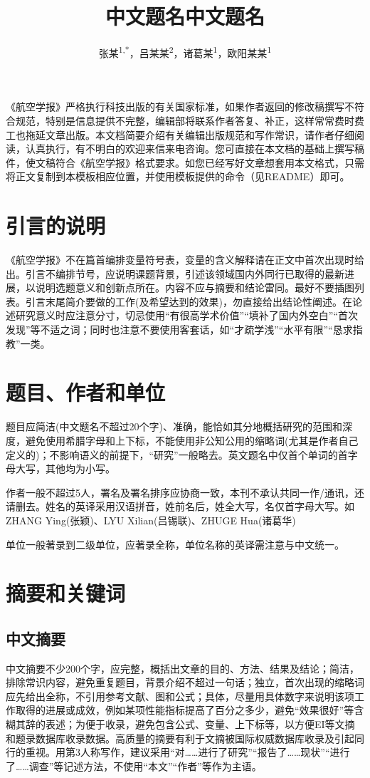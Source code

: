 \documentclass{aaas}
\title{中文题名中文题名\aaasnote{\fontsize{9bp}{9bp}\selectfont(中文题名不超过20字)}}
\author{张某\textsuperscript{1,*}，吕某某\textsuperscript{2}，诸葛某\textsuperscript{1}，欧阳某某\textsuperscript{1}}
\newcommand\mycolorRed[1]{{\color{red}#1}}
\begin{document}
\maketitle

《航空学报》严格执行科技出版的有关国家标准，如果作者返回的修改稿撰写不符合规范，特别是信息提供不完整，编辑部将联系作者答复、补正，这样常常费时费工也拖延文章出版。本文档简要介绍有关编辑出版规范和写作常识，请作者仔细阅读，认真执行，有不明白的欢迎来信来电咨询。您可直接在本文档的基础上撰写稿件，使文稿符合《航空学报》格式要求。如您已经写好文章想\mycolorRed{套用本文格式}，只需将正文复制到本模板相应位置，并使用模板提供的命令（见README）即可。

\section{引言的说明}
《航空学报》\mycolorRed{不在篇首编排变量符号表}，变量的含义解释请在正文中首次出现时给出。\mycolorRed{引言不编排节号，}应说明课题背景，引述该领域国内外同行已取得的最新进展，以说明选题意义和创新点所在。\mycolorRed{内容不应与摘要和结论雷同。最好不要插图列表}。引言末尾简介要做的工作(及希望达到的效果)，勿直接给出结论性阐述。在论述研究意义时应注意分寸，切忌使用“有很高学术价值”“填补了国内外空白”“首次发现”等不适之词；同时也注意不要使用客套话，如“才疏学浅”“水平有限”“恳求指教”一类。

\section{题目、作者和单位}
题目应简洁(中文题名不超过20个字)、准确，能恰如其分地概括研究的范围和深度，避免使用希腊字母和上下标，不能使用非公知公用的缩略词(尤其是作者自己定义的)；不影响语义的前提下，“研究”一般略去。英文题名中仅首个单词的首字母大写，其他均为小写。

作者一般不超过5人，署名及署名排序应协商一致，本刊不承认共同一作/通讯，还请删去。姓名的英译采用汉语拼音，姓前名后，姓全大写，名仅首字母大写。如ZHANG Ying(张颖)、LYU Xilian(吕锡联)、ZHUGE Hua(诸葛华)

单位一般著录到二级单位，应著录全称，单位名称的英译需注意与中文统一。

\section{摘要和关键词}
\subsection{中文摘要}
中文摘要不少200个字，应完整，概括出文章的\mycolorRed{目的、方法、结果及结论}；简洁，排除常识内容，避免重复题目，背景介绍不超过一句话；独立，首次出现的缩略词应先给出全称，不引用参考文献、图和公式；具体，尽量用具体数字来说明该项工作取得的进展或成效，例如某项性能指标提高了百分之多少，避免“效果很好”等含糊其辞的表述；为便于收录，避免包含公式、变量、上下标等，以方便EI等文摘和题录数据库收录数据。高质量的摘要有利于文摘被国际权威数据库收录及引起同行的重视。用第3人称写作，建议采用“对……进行了研究”“报告了……现状”“进行了……调查”等记述方法，不使用“本文”“作者”等作为主语。
\end{document}
